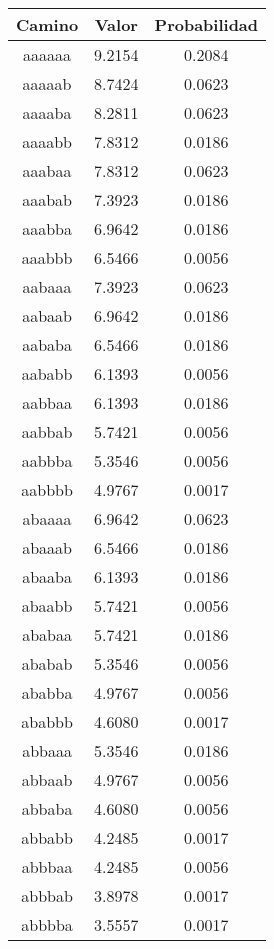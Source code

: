 \begin{figure}[hbpt]
\begin{minipage}{0.48\textwidth}
\begin{center}
\begin{tabular}{|c|c|c|}
\hline
\textbf{Camino} & \textbf{Valor} & \textbf{Probabilidad} \\
\hline
aaaaaa  &  9.2154  &  0.2084  \\
aaaaab  &  8.7424  &  0.0623  \\
aaaaba  &  8.2811  &  0.0623  \\
aaaabb  &  7.8312  &  0.0186  \\
aaabaa  &  7.8312  &  0.0623  \\
aaabab  &  7.3923  &  0.0186  \\
aaabba  &  6.9642  &  0.0186  \\
aaabbb  &  6.5466  &  0.0056  \\
aabaaa  &  7.3923  &  0.0623  \\
aabaab  &  6.9642  &  0.0186  \\
aababa  &  6.5466  &  0.0186  \\
aababb  &  6.1393  &  0.0056  \\
aabbaa  &  6.1393  &  0.0186  \\
aabbab  &  5.7421  &  0.0056  \\
aabbba  &  5.3546  &  0.0056  \\
aabbbb  &  4.9767  &  0.0017  \\
abaaaa  &  6.9642  &  0.0623  \\
abaaab  &  6.5466  &  0.0186  \\
abaaba  &  6.1393  &  0.0186  \\
abaabb  &  5.7421  &  0.0056  \\
ababaa  &  5.7421  &  0.0186  \\
ababab  &  5.3546  &  0.0056  \\
ababba  &  4.9767  &  0.0056  \\
ababbb  &  4.6080  &  0.0017  \\
abbaaa  &  5.3546  &  0.0186  \\
abbaab  &  4.9767  &  0.0056  \\
abbaba  &  4.6080  &  0.0056  \\
abbabb  &  4.2485  &  0.0017  \\
abbbaa  &  4.2485  &  0.0056  \\
abbbab  &  3.8978  &  0.0017  \\
abbbba  &  3.5557  &  0.0017  \\

\end{tabular}
\end{center}
\end{minipage}
\end{figure}
